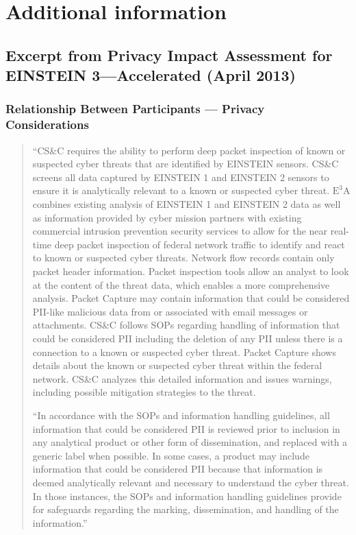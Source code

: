 \documentclass[fleqn,10pt]{wlscirep}
\newcommand{\ETA}{$\textrm{E}^\textrm{3}\textrm{A}$\xspace}
\begin{document}
\section{Additional information}

\subsection{Excerpt from Privacy Impact Assessment for EINSTEIN 3---Accelerated (April 2013)}

\subsubsection{Relationship Between Participants --- Privacy Considerations}\label{excerpt1}
\begin{quote}
  ``CS\&C requires the ability to perform deep packet inspection of known or
suspected cyber threats that are identified by EINSTEIN sensors. CS\&C screens all data
captured by EINSTEIN 1 and EINSTEIN 2 sensors to ensure it is analytically relevant to
a known or suspected cyber threat. \ETA combines existing analysis of EINSTEIN 1 and
EINSTEIN 2 data as well as information provided by cyber mission partners with
existing commercial intrusion prevention security services to allow for the near real-time
deep packet inspection of federal network traffic to identify and react to known or
suspected cyber threats. Network flow records contain only packet header information.
Packet inspection tools allow an analyst to look at the content of the threat data, which
enables a more comprehensive analysis. Packet Capture may contain information that
could be considered PII-like malicious data from or associated with email messages or
attachments. CS\&C follows SOPs regarding handling of information that could be
considered PII including the deletion of any PII unless there is a connection to a known
or suspected cyber threat. Packet Capture shows details about the known or suspected
cyber threat within the federal network. CS\&C analyzes this detailed information and
issues warnings, including possible mitigation strategies to the threat.

  ``In accordance with the SOPs and information handling guidelines, all information
that could be considered PII is reviewed prior to inclusion in any analytical product or
other form of dissemination, and replaced with a generic label when possible. In some
cases, a product may include information that could be considered PII because that
information is deemed analytically relevant and necessary to understand the cyber threat.
In those instances, the SOPs and information handling guidelines provide for safeguards
regarding the marking, dissemination, and handling of the
information.''\cite[p.9]{dhs-e3a-pia}
\end{quote}
\end{document}
